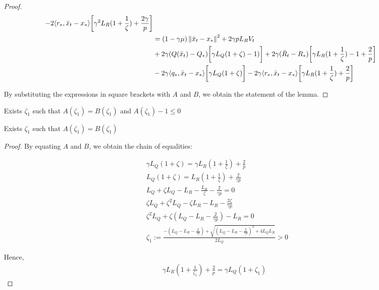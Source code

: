 \begin{proof}
\begin{align}
\begin{split}
            - 2\langle r_*, \bar{x}_t - x_*\rangle\biggr[ \gamma^2 L_R(1+\frac{1}{\zeta}) + \frac{2\gamma}{p} \biggr] \\
            &= (1 - \gamma \mu)\left\|\bar{x}_t - x_*\right\|^2 + 2 \gamma p L_R V_t \\
            &+ 2\gamma (Q(\bar{x}_t) - Q_*)\biggr[ \gamma L_Q (1+\zeta) - 1) \biggr] 
            + 2\gamma (\bar{R}_t - R_*)\biggr[ \gamma L_R (1+\frac{1}{\zeta}) - 1 + \frac{2}{p} \biggr] \\
            &- 2\gamma \langle q_*, \bar{x}_t - x_*\rangle\biggr[ \gamma L_Q(1+\zeta)  \biggr]
            - 2\gamma \langle r_*, \bar{x}_t - x_*\rangle\biggr[ \gamma L_R(1+\frac{1}{\zeta}) + \frac{2}{p} \biggr]
        \end{split}
    \end{align}
        
By substituting the expressions in square brackets with $A$ and $B$, we obtain the statement of the lemma.
\end{proof}

\begin{lemma}\label{lem:Technical}
    Exists $\zeta_1$ such that $A(\zeta_1) = B(\zeta_1)$ and $A(\zeta_1) - 1 \leq 0$
\end{lemma}
\begin{sublemma}\label{sublem:sublemma_1}
    Exists $\zeta_1$ such that $A(\zeta_1) = B(\zeta_1)$
\end{sublemma}
\begin{proof}
    By equating $A$ and $B$, we obtain the chain of equalities:

    \begin{align}
        &\gamma L_Q(1+\zeta)= \gamma L_R(1+\frac{1}{\zeta}) + \frac{2}{p} \\
        &L_Q(1+\zeta) = L_R(1+\frac{1}{\zeta}) + \frac{2}{\gamma p} \\
        &L_Q + \zeta L_Q - L_R - \frac{L_R}{\zeta} - \frac{2}{\gamma p} = 0 \\
        &\zeta L_Q + \zeta^2 L_Q - \zeta L_R - L_R - \frac{2\zeta}{\gamma p} \\
        &\zeta^2 L_Q + \zeta (L_Q - L_R - \frac{2}{\gamma p}) - L_R = 0 \\
        &\zeta_{1} := \frac{-(L_Q - L_R - \frac{2}{\gamma p}) + \sqrt{(L_Q - L_R - \frac{2}{\gamma p})^2 + 4 L_Q L_R}}{2L_Q} > 0
    \end{align}
    
    Hence,
    \begin{align}
        \gamma L_R (1+\frac{1}{\zeta_1}) + \frac{2}{p} = \gamma L_Q (1+\zeta_1) \label{eq:St_5}
    \end{align}
\end{proof}


